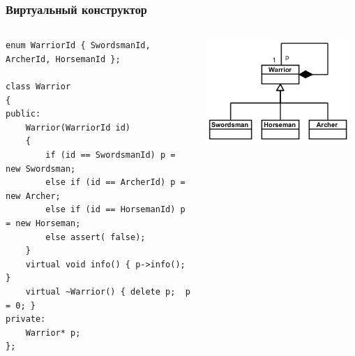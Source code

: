 \documentclass[xetex,mathserif,serif]{beamer}
\begin{document}
    \begin{frame}[fragile]
        \frametitle{Виртуальный конструктор}
        \begin{columns}
            \begin{column}{0.6\textwidth}
                \begin{footnotesize}
                    \begin{verbatim}
enum WarriorId { SwordsmanId, ArcherId, HorsemanId };

class Warrior
{
public:  
    Warrior(WarriorId id)
    {
        if (id == SwordsmanId) p = new Swordsman;
        else if (id == ArcherId) p = new Archer;
        else if (id == HorsemanId) p = new Horseman;
        else assert( false);
    }
    virtual void info() { p->info(); }
    virtual ~Warrior() { delete p;  p = 0; }
private:
    Warrior* p;
};
                    \end{verbatim}
                \end{footnotesize}
            \end{column}
            \begin{column}{0.4\textwidth}
                \begin{center}
                    \includegraphics[width=0.95\textwidth]{warriorVirtualCtor.png}
                \end{center}
            \end{column}
        \end{columns}
    \end{frame}
\end{document}
